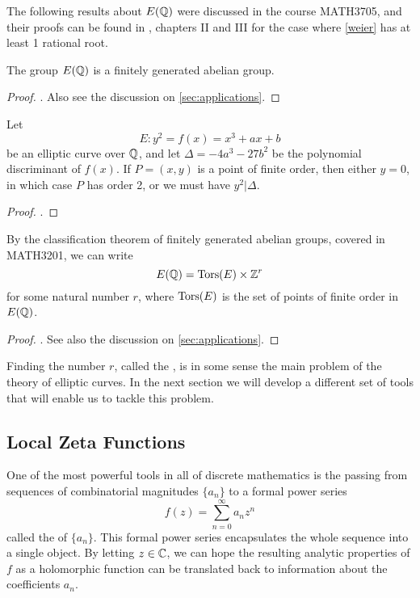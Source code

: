 \documentclass[12pt, a4paper]{amsart}
\begin{document}
The following results about $E({\mathbb Q})$ were discussed in the course MATH3705,
and their proofs can be found in \cite{rational}, chapters II and III for the
case where \autoref{weier} has at least 1 rational root.

\begin{thm}
  The group $E({\mathbb Q})$ is a finitely generated abelian group.
\end{thm}  
\begin{proof}
  \cite[See][Chapter III, pages 63-88]{rational}. Also see the discussion on
  \autoref{sec:applications}.
\end{proof}

\begin{thm} \label{thm:nagelllutz}
  Let
  \[E: y^2 = f(x) = x^3 + ax + b\]
  be an elliptic curve over ${\mathbb Q}$, and let $\Delta = -4a^3 -27b^2$ be the
  polynomial discriminant of $f(x)$. If $P = (x,y)$ is a point of finite order,
  then either $y = 0$, in which case $P$ has order 2, or we must have $y^2 | \Delta$.
\end{thm}
\begin{proof}
  \cite[See][Chapter II, pages 49-56]{rational}.
\end{proof}

By the classification theorem of finitely generated abelian groups, covered in
MATH3201, we can write
\[E({\mathbb Q}) = {\text{\normalfont Tors}}(E) \times {\mathbb Z}^r\]
for some natural number $r$, where ${\text{\normalfont Tors}}(E)$ is the set of points of finite
order in $E({\mathbb Q})$.

\begin{proof}
  \cite[See][Chapter III, pages 63-88]{rational}. See also the discussion on
  \autoref{sec:applications}.
\end{proof}

Finding the number $r$, called the , is in some sense the
main problem of the theory of elliptic curves. In the next section we will
develop a different set of tools that will enable us to tackle this problem.

\subsection{Local Zeta Functions}

One of the most powerful tools in all of discrete mathematics is the passing
from sequences of combinatorial magnitudes $\{a_n\}$ to a formal power series
\[f(z) = \sum\limits_{n=0}^\infty a_nz^n\]
called the  of $\{a_n\}.$ This formal power series
encapsulates the whole sequence into a single object. By letting $z \in {\mathbb C}$,
we can hope the
resulting analytic properties of $f$ as a holomorphic function can be translated
back to information about the coefficients $a_n$.
\end{document}
